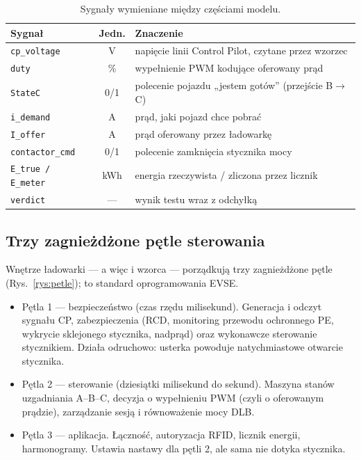 \documentclass[11pt]{article}
\newcommand{\key}[1]{#1}
\begin{document}
\begin{table}[h]
\centering
\begin{tabularx}{\linewidth}{@{}l c X@{}}
\toprule
\textbf{Sygnał} & \textbf{Jedn.} & \textbf{Znaczenie} \\
\midrule
\texttt{cp\_voltage} & V & napięcie linii Control Pilot, czytane przez wzorzec \\
\texttt{duty} & \% & wypełnienie PWM kodujące oferowany prąd \\
\texttt{StateC} & 0/1 & polecenie pojazdu „jestem gotów” (przejście B$\to$C) \\
\texttt{i\_demand} & A & prąd, jaki pojazd chce pobrać \\
\texttt{I\_offer} & A & prąd oferowany przez ładowarkę \\
\texttt{contactor\_cmd} & 0/1 & polecenie zamknięcia stycznika mocy \\
\texttt{E\_true / E\_meter} & kWh & energia rzeczywista / zliczona przez licznik \\
\texttt{verdict} & --- & wynik testu wraz z odchyłką \\
\bottomrule
\end{tabularx}
\caption{Sygnały wymieniane między częściami modelu.}
\label{tab:sygnaly}
\end{table}

\subsection{Trzy zagnieżdżone pętle sterowania}

Wnętrze ładowarki --- a więc i wzorca --- porządkują trzy zagnieżdżone pętle (Rys.~\ref{rys:petle}); to standard oprogramowania EVSE.

\begin{itemize}
  \item \key{Pętla 1 --- bezpieczeństwo} (czas rzędu milisekund). Generacja i odczyt sygnału CP, zabezpieczenia (RCD, monitoring przewodu ochronnego PE, wykrycie sklejonego stycznika, nadprąd) oraz wykonawcze sterowanie stycznikiem. Działa odruchowo: usterka powoduje natychmiastowe otwarcie stycznika.
  \item \key{Pętla 2 --- sterowanie} (dziesiątki milisekund do sekund). Maszyna stanów uzgadniania A--B--C, decyzja o wypełnieniu PWM (czyli o oferowanym prądzie), zarządzanie sesją i równoważenie mocy DLB.
  \item \key{Pętla 3 --- aplikacja}. Łączność, autoryzacja RFID, licznik energii, harmonogramy. Ustawia nastawy dla pętli 2, ale sama nie dotyka stycznika.
\end{itemize}
\end{document}
